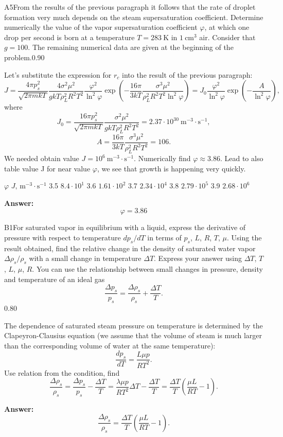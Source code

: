 \documentclass[11pt,a4paper]{article}
\begin{document}
\begin{solcard}{A5}{From the results of the previous paragraph it follows that the rate of droplet formation very much depends on the steam supersaturation coefficient. Determine numerically the value of the vapor supersaturation coefficient $\varphi$, at which one drop per second is born at a temperature $T = 283~\text{K}$ in $1~\text{cm}^3$ air. Consider that $g = 100$. The remaining numerical data are given at the beginning of the problem.}{0.90}

Let's substitute the expression for $r_c$ into the result of the previous paragraph: $$ J = \frac{4\pi p_s^2}{\sqrt{2\pi m k T}} \frac{4 \sigma^2 \mu^2}{g k T \rho_L^2 R^2 T^2} \frac{\varphi^2}{\ln^2 \varphi}\exp\left( -  \frac{16 \pi}{3 kT} \frac{\sigma^3 \mu^2}{\rho_L^2 R^2 T^2 \ln^2 \varphi}\right) = J_0 \frac{\varphi^2}{\ln^2 \varphi} \exp\left(- \frac{A}{\ln^2 \varphi} \right), $$where $$ J_0 = \frac{16\pi p_s^2}{\sqrt{2\pi m k T}} \frac{ \sigma^2 \mu^2}{g k T \rho_L^2 R^2 T^2} =  2.37 \cdot 10^{30} ~ \text{m}^{-3} \cdot \text{s}^{-1}, $$$$ A = \frac{16 \pi}{3 kT} \frac{\sigma^3 \mu^2}{\rho_L^2 R^2 T^2 } =  106. $$We needed obtain value $J = 10^6 ~ \text{m}^{-3} \cdot \text{s}^{-1}$. Numerically find $\varphi \approx 3.86 $. Lead to also table value J for near value $\varphi$, we see that growth is happening very quickly.


$\varphi$ $J, \, \text{m}^{-3} \cdot \text{s}^{-1}$ 3.5 $8.4 \cdot 10^1$ 3.6 $1.61 \cdot 10^2$ 3.7 $2.34 \cdot 10^4$ 3.8 $2.79 \cdot 10^5$ 3.9 $2.68 \cdot 10^6$

\par\smallskip\noindent\textbf{Answer:} $$ \varphi = 3.86 $$
\end{solcard}

\begin{solcard}{B1}{For saturated vapor in equilibrium with a liquid, express the derivative of pressure with respect to temperature $dp_s/dT$ in terms of $p_s$, $L$, $R$, $T$, $\mu$. Using the result obtained, find the relative change in the density of saturated water vapor $\Delta \rho_s/\rho_s$ with a small change in temperature $\Delta T$. Express your answer using $\Delta T$, $T$, $L$, $\mu$, $R$. You can use the relationship between small changes in pressure, density and temperature of an ideal gas $$ \frac{\Delta p_s}{p_s} = \frac{\Delta \rho_s}{\rho_s} +\frac {\Delta T}{T}. $$}{0.80}

The dependence of saturated steam pressure on temperature is determined by the Clapeyron-Clausius equation (we assume that the volume of steam is much larger than the corresponding volume of water at the same temperature): $$ \frac{dp_s}{dT} = \frac{L \mu p}{R T^2}. $$Use relation from the condition, find $$ \frac{\Delta \rho_s}{\rho_s} = \frac{\Delta p_s}{p_s} - \frac{\Delta T}{T} = \frac{\lambda \mu p}{R T^2} \Delta T  - \frac{\Delta T}{T} = \frac{\Delta T}{T} \left( \frac{\mu L}{R T} - 1\right). $$

\par\smallskip\noindent\textbf{Answer:} $$ \frac{\Delta \rho_s}{\rho_s} = \frac{\Delta T}{T} \left( \frac{\mu L}{R T} - 1\right). $$
\end{solcard}
\end{document}
